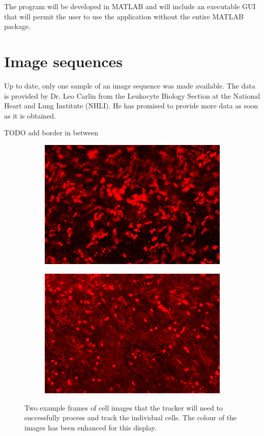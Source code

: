 \documentclass[12pt,a4paper,openany]{book}
\begin{document}
The program will be developed in MATLAB and will include an executable GUI that will permit the user to use the application without the entire MATLAB package.

\section{Image sequences}

Up to date, only one sample of an image sequence was made available. The data is provided by Dr. Leo Carlin from the Leukocyte Biology Section at the National Heart and Lung Institute (NHLI). He has promised to provide more data as soon as it is obtained.

TODO add border in between
\begin{figure}
\centering
\begin{subfigure}{.5\textwidth}
  \centering
  \includegraphics[width=\textwidth]{frame1.png}
  \caption{}
\end{subfigure}%
\begin{subfigure}{.5\textwidth}
  \centering
  \includegraphics[width=\textwidth]{frame2.png}
  \caption{}
\end{subfigure}
\caption{Two example frames of cell images that the tracker will need to successfully process and track the individual cells. The colour of the images has been enhanced for this display.}
\label{fig:sampleframes}
\end{figure}
\end{document}
